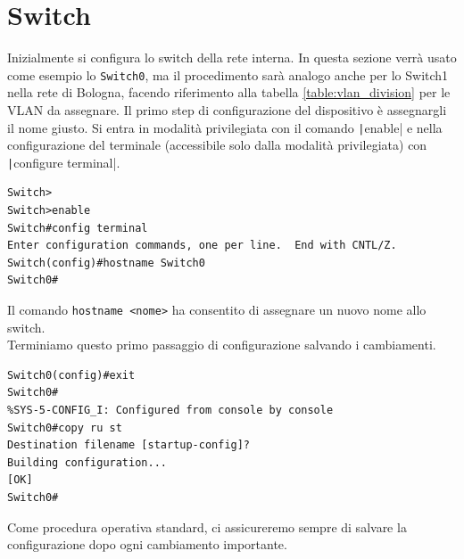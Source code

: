 \documentclass[a4paper,12pt]{report}
\begin{document}
\section{Switch}
Inizialmente si configura lo switch della rete interna.
%
In questa sezione verrà usato come esempio lo \texttt{Switch0}, ma il procedimento sarà analogo anche per lo Switch1 nella rete di Bologna, facendo riferimento alla tabella \ref{table:vlan_division} per le VLAN da assegnare.
Il primo step di configurazione del dispositivo è assegnargli il nome giusto.
%
Si entra in modalità privilegiata con il comando \texttt|enable| e nella configurazione del terminale (accessibile solo dalla modalità privilegiata) con \texttt|configure terminal|.
\begin{verbatim}
Switch>
Switch>enable
Switch#config terminal
Enter configuration commands, one per line.  End with CNTL/Z.
Switch(config)#hostname Switch0
Switch0#
\end{verbatim}
Il comando \texttt{hostname <nome>} ha consentito di assegnare un nuovo nome allo switch.
\\Terminiamo questo primo passaggio di configurazione salvando i cambiamenti.
\begin{verbatim}
Switch0(config)#exit
Switch0#
%SYS-5-CONFIG_I: Configured from console by console
Switch0#copy ru st
Destination filename [startup-config]? 
Building configuration...
[OK]
Switch0#
\end{verbatim}
Come procedura operativa standard, ci assicureremo sempre di salvare la configurazione dopo ogni cambiamento importante. 
\end{document}
